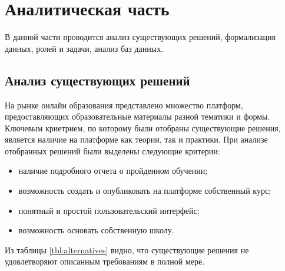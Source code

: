 \chapter{Аналитическая часть}

В данной части проводится анализ существующих решений, формализация данных, ролей и задачи, анализ баз данных.

\section{Анализ существующих решений}
На рынке онлайн образования представлено множество платформ, предоставляющих образовательные материалы разной тематики и формы. Ключевым криетрием, по которому были отобраны существующие решения, является наличие на платформе как теории, так и практики. При анализе отобранных решений были выделены следующие критерии:
\begin{itemize}
    \item наличие подробного отчета о пройденном обучении;
    \item возможность создать и опубликовать на платформе собственный курс;
    \item понятный и простой пользовательский интерфейс;
    \item возможность основать собственную школу.
\end{itemize}

\begin{table}[H]
    \caption{\label{tbl:alternatives}Сравнение существующих решений}
\end{table}

Из таблицы \ref{tbl:alternatives} видно, что существующие решения не удовлетворяют описанным требованиям в полной мере.

